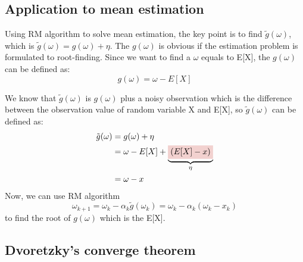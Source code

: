 \subsection{Application to mean estimation}

  Using RM algorithm to solve mean estimation, the key point is to find $\tilde{g}(\omega)$, which is
  $\tilde{g}(\omega)=g(\omega)+\eta$. The $g(\omega)$ is obvious if the estimation problem is formulated to root-finding.
  Since we want to find a $\omega$ equals to E[X], the $g(\omega)$ can be defined as:
  \begin{equation*}
    g(\omega) = \omega - E[X]
  \end{equation*}
  \par We know that $\tilde{g}(\omega)$ is $g(\omega)$ plus a noisy observation which is the difference between the
  observation value of random variable X and E[X], so $\tilde{g}(\omega)$ can be defined as:
  \begin{align*}
    \tilde{g}(\omega) & = g(\omega) + \eta                                                            \\
                      & = \omega - E[X] + \underbrace{\colorbox{myred!20!white}{$(E[X] - x)$}}_{\eta} \\
                      & = \omega - x
  \end{align*}
  Now, we can use RM algorithm
  \begin{equation*}
    \omega_{k+1} = \omega_{k} - \alpha_{k}\tilde{g}(\omega_{k}) = \omega_{k} - \alpha_{k}(\omega_{k}-x_{k})
  \end{equation*}
  to find the root of $g(\omega)$ which is the E[X]. 

\subsection{Dvoretzky's converge theorem}

